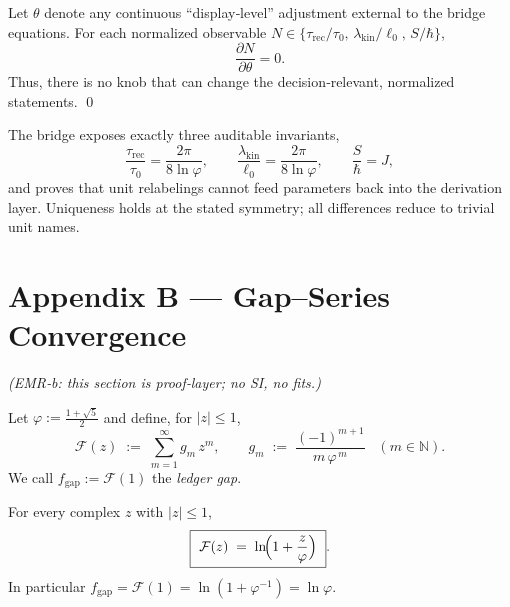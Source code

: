 \documentclass[11pt]{article}
\begin{document}
\begin{proposition}
\begin{corollary}
Let $\theta$ denote any continuous “display‑level” adjustment external to the bridge equations. For each normalized observable $N\in\{\tau_{\mathrm{rec}}/\tau_{0},\,\lambda_{\mathrm{kin}}/\ell_{0},\,S/\hbar\}$,
\[
\frac{\partial N}{\partial\theta}=0.
\]
Thus, there is no knob that can change the decision‑relevant, normalized statements. \qed
\end{corollary}

\begin{remark}
The bridge exposes exactly three auditable invariants,
\[
\frac{\tau_{\mathrm{rec}}}{\tau_{0}}=\frac{2\pi}{8\ln\varphi},\qquad
\frac{\lambda_{\mathrm{kin}}}{\ell_{0}}=\frac{2\pi}{8\ln\varphi},\qquad
\frac{S}{\hbar}=J,
\]
and proves that unit relabelings cannot feed parameters back into the derivation layer. Uniqueness holds at the stated symmetry; all differences reduce to trivial unit names.  %
\end{remark}

\section*{Appendix B — Gap–Series Convergence}
\emph{(EMR‑b: this section is proof‑layer; no SI, no fits.)}

\begin{definition}
\label{def:gap-coeff}
Let \(\displaystyle \varphi:=\frac{1+\sqrt5}{2}\) and define, for \(|z|\le 1\),
\[
  \mathcal F(z)\;:=\;\sum_{m=1}^{\infty} g_{m}\,z^{m},
  \qquad
  g_{m}\;:=\;\frac{(-1)^{m+1}}{m\,\varphi^{\,m}}\;\;\;(m\in\mathbb N).
\]
We call \(f_{\mathrm{gap}}:=\mathcal F(1)\) the \emph{ledger gap}. 
\end{definition}

\begin{proposition}
\label{prop:closed-form}
For every complex \(z\) with \(|z|\le 1\),
\[
  \boxed{ \ \mathcal F(z) \;=\; \ln\!\Bigl(1+\frac{z}{\varphi}\Bigr) \ } .
\]
In particular \(f_{\mathrm{gap}}=\mathcal F(1)=\ln(1+\varphi^{-1})=\ln\varphi\).
\end{proposition}


\end{proposition}
\end{document}
